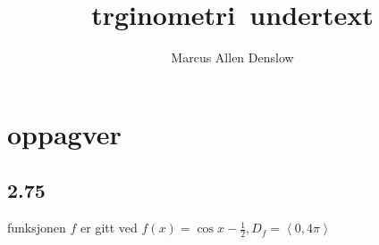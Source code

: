 \documentclass{report}
\title{\Huge{trginometri}\ undertext}
\author{\Huge{Marcus Allen Denslow}}
\date{}
\begin{document}
\maketitle
\newpage%
\tableofcontents
\pagebreak

\chapter{oppagver}
\section{2.75}

funksjonen $f$ er gitt ved  $\displaystyle f(x) = \cos x - \frac{1}{2}, D_{f} = \left< 0, 4\pi \right>$ 
\end{document}
